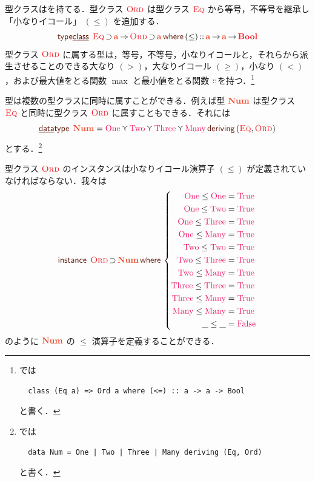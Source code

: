 \documentclass[a5paper,twoside,fleqn,draft]{jsbook}
\begin{document}

型クラスはを持てる．型クラス $\hOrd$ は型クラス $\hEq$ から等号，不等号を継承し「小なりイコール」 $(\le)$ を追加する．
\begin{equation}
  \mTypeClassDecl\;\hEq\hHasElementsOf\mA
  \hAndThen\mathop{\hOrd}\hHasElementsOf\mA
  \mWhere{}(\le)\hIsTypeOf\mProjEXP{\mA }{\mProjEXP{\mA }{\hBool}}
\end{equation}
型クラス $\hOrd$ に属する型は，等号，不等号，小なりイコールと，それらから派生させることのできる大なり $(>)$，大なりイコール $(\ge)$，小なり $(<)$，および最大値をとる関数 $\max$ と最小値をとる関数 $\operatorname{:\!:}$を持つ．\footnote{\haskell では
\begin{verbatim}
  class (Eq a) => Ord a where (<=) :: a -> a -> Bool
\end{verbatim}
と書く．}

\separator

型は複数の型クラスに同時に属すことができる．例えば型 $\mType{Num}$ は型クラス $\hEq$ と同時に型クラス $\hOrd$ に属すこともできる．それには
\begin{equation}
\mDataType\;\mType{Num}
=\mNumOne\mValueOr\mNumTwo\mValueOr\mNumThree\mValueOr\mNumMany
\mDeriving{}(\hEq,\hOrd)
\end{equation}
とする．\footnote{\haskell では
\begin{verbatim}
  data Num = One | Two | Three | Many deriving (Eq, Ord)
\end{verbatim}
と書く．}

型クラス $\hOrd$ のインスタンスは小なりイコール演算子 $(\le)$ が定義されていなければならない．我々は
\begin{equation}
  \mInstanceDecl\;\hOrd\hHasElementsOf\mType{Num}
  \mWhere{}
  \left\{
  \begin{aligned}
    \mNumOne\le\mNumOne&=\hTrue\\
    \mNumOne\le\mNumTwo&=\hTrue\\
    \mNumOne\le\mNumThree&=\hTrue\\
    \mNumOne\le\mNumMany&=\hTrue\\
    \mNumTwo\le\mNumTwo&=\hTrue\\
    \mNumTwo\le\mNumThree&=\hTrue\\
    \mNumTwo\le\mNumMany&=\hTrue\\
    \mNumThree\le\mNumThree&=\hTrue\\
    \mNumThree\le\mNumMany&=\hTrue\\
    \mNumMany\le\mNumMany&=\hTrue\\
    \_\le\_&=\hFalse
  \end{aligned}
  \right.
\end{equation}
のように $\mType{Num}$ の $\le$ 演算子を定義することができる．
\end{document}
